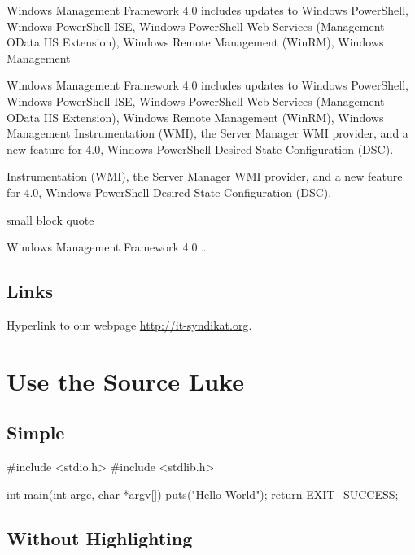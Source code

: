 \documentclass[10pt,a4paper,parskip=half]{scrartcl}
\theoremstyle{plain}
\renewenvironment{quote}
    {\hfill\begin{minipage}{0.95\textwidth}\begin{blockquote}}
    {\end{blockquote}\end{minipage}}
\begin{document}
\begin{quote}
    Windows Management Framework 4.0 includes updates to Windows PowerShell,
    Windows PowerShell ISE, Windows PowerShell Web Services (Management OData
    IIS Extension), Windows Remote Management (WinRM), Windows Management

    \begin{quote}
        Windows Management Framework 4.0 includes updates to Windows PowerShell,
        Windows PowerShell ISE, Windows PowerShell Web Services (Management OData
        IIS Extension), Windows Remote Management (WinRM), Windows Management
        Instrumentation (WMI), the Server Manager WMI provider, and a new feature
        for 4.0, Windows PowerShell Desired State Configuration (DSC).
    \end{quote}

    Instrumentation (WMI), the Server Manager WMI provider, and a new feature
    for 4.0, Windows PowerShell Desired State Configuration (DSC).
\end{quote}

small block quote

\begin{quote}
    Windows Management Framework 4.0 \dots
\end{quote}

\subsection{Links}
\label{sub:links}

Hyperlink to our webpage \url{http://it-syndikat.org}.

\newpage

\section{Use the Source Luke}
\label{sec:use_the_source_luke}

\subsection{Simple}
\label{sub:simple}

\begin{ccode}
#include <stdio.h>
#include <stdlib.h>

int main(int argc, char *argv[]) {
    puts("Hello World");
    return EXIT_SUCCESS;
}
\end{ccode}

\subsection{Without Highlighting}
\label{sub:without_highlighting}
\end{document}
